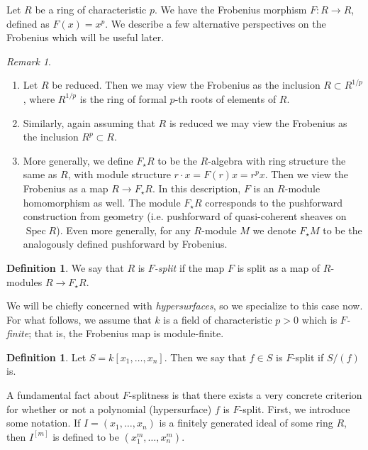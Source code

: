 \documentclass[a4paper]{article}
\theoremstyle{definition}
\newtheorem{defn}[thm]{Definition}
\theoremstyle{remark}
\newtheorem{rmk}[thm]{Remark}
\newcommand{\ins}{\subset}
\newcommand{\Spec}{\operatorname{Spec}}
\begin{document}
Let \(R\) be a ring of characteristic \(p\). 
We have the Frobenius morphism 
\(F \colon R \xrightarrow{} R\), 
defined as \(F(x) = x^p\).
We describe a few alternative perspectives on
the Frobenius which will be useful later.

\begin{rmk}
	\label{rmk:frob:perspectives}
    \hfill
    \begin{enumerate}[(1)]
    	\item Let \(R\) be reduced. 
    		Then we may view the Frobenius as the inclusion
    		\(R \ins R^{1 / p}\), where \(R^{1 / p}\) 
    		is the ring of formal \(p\)-th roots of elements
    		of \(R\).
    	\item Similarly, again assuming that \(R\) is reduced
    		we may view the Frobenius as the inclusion
    		\(R^{p} \ins R\).
    	\item More generally, we define \(F_{\star}R\) to
			be the \(R\)-algebra with ring structure 
			the same as \(R\), with module structure
			\(r \cdot x = F(r)x = r^{p}x\).
			Then we view the Frobenius as a map
			\(R \xrightarrow{} F_{\star}R\).
			In this description, \(F\) is an \(R\)-module 
			homomorphism as well. 
			The module \(F_{\star}R\) corresponds to the
			pushforward construction from geometry
			(i.e. pushforward of quasi-coherent
			sheaves on \(\Spec R\)).
			Even more generally, for any \(R\)-module
			\(M\) we denote \(F_{\star}M\) to be
			the analogously defined pushforward by
			Frobenius.
    \end{enumerate}
\end{rmk}

\begin{defn}
	We say that \(R\) is \textit{\(F\)-split} if the map \(F\) is
	split as a map of 
	\(R\)-modules \(R \xrightarrow{} F_{\star}R\).
\end{defn}

We will be chiefly concerned with \textit{hypersurfaces},
so we specialize to this case now.
For what follows, we assume that \(k\) is a field
of characteristic \(p > 0\) which is 
\textit{\(F\)-finite}; that is, the Frobenius
map is module-finite.

\begin{defn}
	Let \(S = k[x_{1}, \ldots, x_{n}]\).
	Then we say that \(f \in S\) is \(F\)-split if 
	\(S / (f)\) is.
\end{defn}

A fundamental fact about \(F\)-splitness is that there
exists a very concrete criterion for whether or 
not a polynomial (hypersurface) \(f\) is \(F\)-split.
First, we introduce some notation.
If \(I = (x_{1}, \ldots, x_{n})\) is a finitely generated 
ideal of some ring \(R\), 
then \(I^{[m]}\)
is defined to be \((x_{1}^{m}, \ldots, x_{n}^{m})\).
\end{document}
